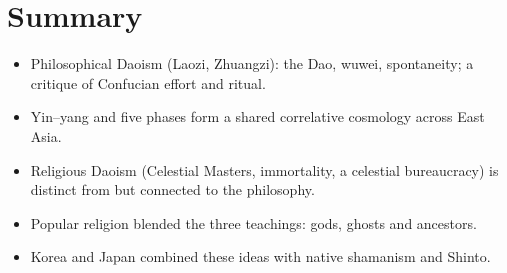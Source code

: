 \section*{Summary}
\begin{itemize}
  \item Philosophical Daoism (Laozi, Zhuangzi): the Dao, wuwei, spontaneity; a critique of
        Confucian effort and ritual.
  \item Yin--yang and five phases form a shared correlative cosmology across East Asia.
  \item Religious Daoism (Celestial Masters, immortality, a celestial bureaucracy) is
        distinct from but connected to the philosophy.
  \item Popular religion blended the three teachings: gods, ghosts and ancestors.
  \item Korea and Japan combined these ideas with native shamanism and Shinto.
\end{itemize}
